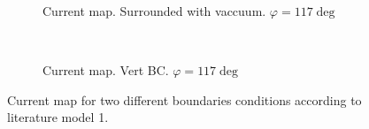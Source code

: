 \documentclass[../main.tex]{subfiles}
\begin{document}
\begin{figure}[H]
    \begin{subfigure}{0.4\textwidth}
        \centering
        
        \caption{Current map. Surrounded with vaccuum. $\varphi = 117 \deg$}
        \label{fig:first}
    \end{subfigure}\\
    \begin{subfigure}{0.4\textwidth}
        \centering
        
        \caption{Current map. Vert BC. $\varphi = 117 \deg$}
        \label{fig:first}
    \end{subfigure}
\caption{Current map for two different boundaries conditions according to literature model 1.}

\end{figure}
\end{document}
